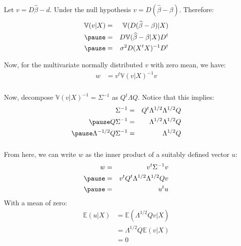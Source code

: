 \begin{frame}[fragile] \frametitle{}

Let $v = D\widehat{\beta} - d$. Under the null hypothesis $v = D (\widehat{\beta} - \beta)$.
\pause Therefore:
\begin{eqnarray*}
\mathbb{V} (v | X) &=& \mathbb{V} (D (\widehat{\beta} - \beta) | X) \\ \pause
&=& D \mathbb{V} (\widehat{\beta} - \beta | X) D^t \\ \pause
&=& \sigma^2 D (X^t X)^{-1} D^t
\end{eqnarray*}

\pause
Now, for the multivariate normally distributed $v$ with zero mean,
we have:
\begin{align*}
w &= v^t \mathbb{V} (v | X)^{-1} v
\end{align*}
\end{frame}

\begin{frame}[fragile] \frametitle{}

Now, decompose $ \mathbb{V} (v | X)^{-1} = \Sigma^{-1}$
as $Q^t \Lambda Q$. Notice that this implies:
\begin{eqnarray*}
\Sigma^{-1} &=& Q^t \Lambda^{1/2} \Lambda^{1/2} Q \\ \pause
Q \Sigma^{-1} &=& \Lambda^{1/2} \Lambda^{1/2} Q  \\ \pause
\Lambda^{-1/2} Q \Sigma^{-1} &=& \Lambda^{1/2} Q
\end{eqnarray*}

\end{frame}

\begin{frame}[fragile] \frametitle{}

From here, we can write $w$ as the inner product of
a suitably defined vector $u$:
\begin{eqnarray*}
w &=& v^t \Sigma^{-1} v \\ \pause
&=& v^t Q^t \Lambda^{1/2} \Lambda^{1/2} Q v \\ \pause
&=& u^t u
\end{eqnarray*}
\pause With a mean of zero:
\begin{align*}
\mathbb{E} (u | X) &= \mathbb{E} (\Lambda^{1/2} Q v | X) \\
&= \Lambda^{1/2} Q \mathbb{E} (v | X) \\
&= 0
\end{align*}

\end{frame}

